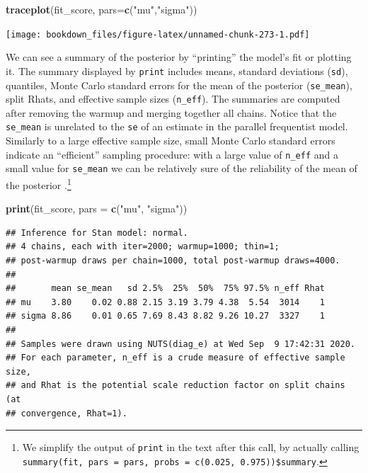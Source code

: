 \documentclass[12pt,]{krantz}
\newenvironment{Shaded}{\begin{snugshade}}{\end{snugshade}}
\newcommand{\DataTypeTok}[1]{\textcolor[rgb]{0.13,0.29,0.53}{#1}}
\newcommand{\KeywordTok}[1]{\textcolor[rgb]{0.13,0.29,0.53}{\textbf{#1}}}
\newcommand{\NormalTok}[1]{#1}
\newcommand{\StringTok}[1]{\textcolor[rgb]{0.31,0.60,0.02}{#1}}
\theoremstyle{definition}
\theoremstyle{definition}
\theoremstyle{definition}
\theoremstyle{remark}
\begin{document}
\begin{Shaded}
\begin{Highlighting}[]
\KeywordTok{traceplot}\NormalTok{(fit_score, }\DataTypeTok{pars=}\KeywordTok{c}\NormalTok{(}\StringTok{"mu"}\NormalTok{,}\StringTok{"sigma"}\NormalTok{))}
\end{Highlighting}
\end{Shaded}

\texttt{[image: bookdown\_files/figure-latex/unnamed-chunk-273-1.pdf]}

We can see a summary of the posterior by ``printing'' the model's fit or plotting it. The summary displayed by \texttt{print} includes means, standard deviations (\texttt{sd}), quantiles, Monte Carlo standard errors for the mean of the posterior (\texttt{se\_mean}), split Rhats, and effective sample sizes (\texttt{n\_eff}). The summaries are computed after removing the warmup and merging together all chains. Notice that the \texttt{se\_mean} is unrelated to the \texttt{se} of an estimate in the parallel frequentist model. Similarly to a large effective sample size, small Monte Carlo standard errors indicate an ``efficient'' sampling procedure: with a large value of \texttt{n\_eff} and a small value for \texttt{se\_mean} we can be relatively sure of the reliability of the mean of the posterior \citep{vehtari2019ranknormalization}.\footnote{We simplify the output of \texttt{print} in the text after this call, by actually calling \texttt{summary(fit,\ pars\ =\ pars,\ probs\ =\ c(0.025,\ 0.975))\$summary}.}

\begin{Shaded}
\begin{Highlighting}[]
\KeywordTok{print}\NormalTok{(fit_score, }\DataTypeTok{pars =} \KeywordTok{c}\NormalTok{(}\StringTok{"mu"}\NormalTok{, }\StringTok{"sigma"}\NormalTok{))}
\end{Highlighting}
\end{Shaded}

\begin{verbatim}
## Inference for Stan model: normal.
## 4 chains, each with iter=2000; warmup=1000; thin=1; 
## post-warmup draws per chain=1000, total post-warmup draws=4000.
## 
##       mean se_mean   sd 2.5%  25%  50%  75% 97.5% n_eff Rhat
## mu    3.80    0.02 0.88 2.15 3.19 3.79 4.38  5.54  3014    1
## sigma 8.86    0.01 0.65 7.69 8.43 8.82 9.26 10.27  3327    1
## 
## Samples were drawn using NUTS(diag_e) at Wed Sep  9 17:42:31 2020.
## For each parameter, n_eff is a crude measure of effective sample size,
## and Rhat is the potential scale reduction factor on split chains (at 
## convergence, Rhat=1).
\end{verbatim}
\end{document}
